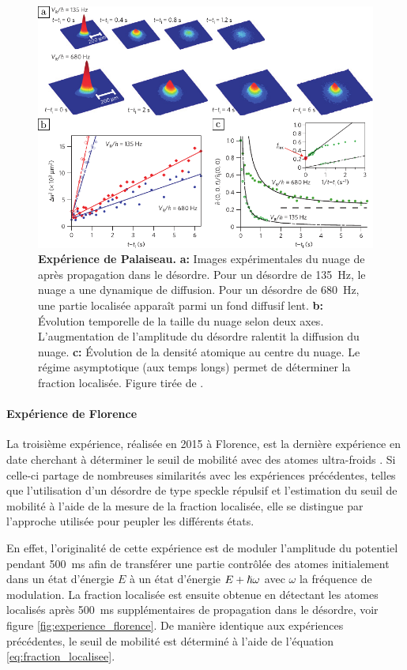 \begin{figure}
\centering
\includegraphics[width=\textwidth]{Fig/Localisation/experience_palaiseau.pdf}
\caption{\textbf{Expérience de Palaiseau.} \textbf{a:} Images expérimentales du nuage de  après propagation dans le désordre. Pour un désordre de \SI{135}{\hertz}, le nuage a une dynamique de diffusion. Pour un désordre de \SI{680}{\hertz}, une partie localisée apparaît parmi un fond diffusif lent. \textbf{b:} Évolution temporelle de la taille du nuage selon deux axes. L'augmentation de l'amplitude du désordre ralentit la diffusion du nuage. \textbf{c:} Évolution de la densité atomique au centre du nuage. Le régime asymptotique (aux temps longs) permet de déterminer la fraction localisée. Figure tirée de \citep{jendrzejewski2012three}.}
\label{fig:experience_palaiseau}
\end{figure}


\paragraph*{Expérience de Florence}
La troisième expérience, réalisée en 2015 à Florence, est la dernière expérience en date cherchant à déterminer le seuil de mobilité avec des atomes ultra-froids \citep{semeghini2015measurement}. Si celle-ci partage de nombreuses similarités avec les expériences précédentes, telles que l'utilisation d'un désordre de type speckle répulsif et l'estimation du seuil de mobilité à l'aide de la mesure de la fraction localisée, elle se distingue par l'approche utilisée pour peupler les différents états. 

En effet, l'originalité de cette expérience est de moduler l'amplitude du potentiel pendant \SI{500}{\milli\second} afin de transférer une partie contrôlée des atomes initialement dans un état d'énergie $E$ à un état d'énergie $E+\hslash \omega$ avec $\omega$ la fréquence de modulation. La fraction localisée est ensuite obtenue en détectant les atomes localisés après \SI{500}{\milli\second} supplémentaires de propagation dans le désordre, voir figure \ref{fig:experience_florence}. De manière identique aux expériences précédentes, le seuil de mobilité est déterminé à l'aide de l'équation \ref{eq:fraction_localisee}.


